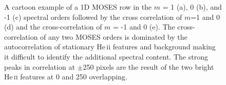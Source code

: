 \begin{figure}
{
			}	
 	 		\caption{A cartoon example of a 1D MOSES row in the $m$ = 1 (a), 0 (b), and -1 (c) spectral orders followed by the cross correlation of $m$=1 and 0 (d) and the cross-correlation of $m$ = -1 and 0 (e).  The cross-correlation of any two MOSES orders is dominated by the autocorrelation of stationary He\,{\sc ii} features and background making it difficult to identify the additional spectral content. The strong peaks in correlation at $\pm$250 pixels are the result of the two bright He\,\textsc{ii} features at 0 and 250 overlapping.}
 	 		\label{fig:methods1}
 	 	\end{figure}
 	 	

